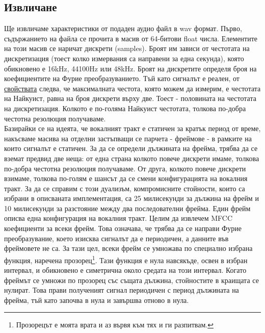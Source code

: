 \documentclass[main.tex]{subfiles}
\begin{document}
    \subsection{Извличане}
    Ще извличаме характеристики от подаден аудио файл в wav формат. Първо, съдържанието на файла се прочита в масив от 64-битови float числа. Елементите на този масив се наричат дискрети (samples). Броят им зависи от честотата на дискретизация (тоест колко измервания са направени за една секунда), която обикновено е 16kHz, 44100Hz или 48kHz. Броят на дискретите определя броя на коефициентите на Фурие преобразуванието. Тъй като сигналът е реален, от \hyperref[appendix:fourier:property]{свойствата} следва, че максималната честота, която можем да измерим, е честотата на Найкуист, равна на броя дискрети върху две. Тоест - половината на честотата на дискретизация.
    Колкото е по-голяма Найкуист честотата, толкова по-добра честотна резолюция получаваме.\\
    Базирайки се на идеята, че вокалният тракт е статичен за кратък период от време, накъсваме масива на отделни застъпващи се парчета - фреймове - в рамките на които сигналът е статичен. За да се определи дължината на фрейма, трябва да се вземат предвид две неща: от една страна колкото повече дискрети имаме, толкова по-добра честотна резолюция получаваме. От друга, колкото повече дискрети взимаме, толкова по-голям е шансът да се смени конфигурацията на вокалния тракт. За да се справим с този дуализъм, компромисните стойности, които са избрани в описваната имплементация, са 25 милисекунди за дължина на фрейм и 10 милисекунди за разстояние между два последователни фрейма. Един фрейм описва една конфигурация на вокалния тракт.
    Целим да извлечем MFCC коефициенти за всеки фрейм. Това означава, че трябва да се направи Фурие преобразувание, което изисква сигналът да е периодичен, а данните във фреймовете не са. За тази цел, всеки фрейм се умножава по специално избрана функция, наречена прозорец\footnote{Прозорецът е моята врата и аз вървя към тях и ги разпитвам.}. Тази функция е нула навсякъде, освен в избран интервал, и обикновено е симетрична около средата на този интервал. Когато фреймът се умножи по прозорец със същата дължина, стойностите в краищата се нулират. Това прави полученият сигнал периодичен с период дължината на фрейма, тъй като започва в нула и завършва отново в нула.
    
\end{document}
